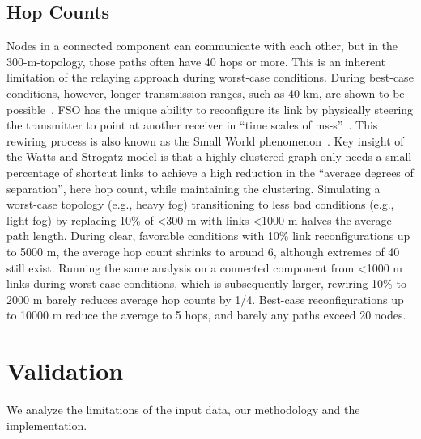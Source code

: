 \documentclass[conference]{IEEEtran}
\begin{document}
    \subsection{Hop Counts}\label{subsec:hop-counts}
    Nodes in a connected component can communicate with each other, but in the 300-m-topology, those paths often have 40 hops or more.
    This is an inherent limitation of the relaying approach during worst-case conditions.
    During best-case conditions, however, longer transmission ranges, such as 40 km, are shown to be possible~\cite{Willitsford:24}.
    FSO has the unique ability to reconfigure its link by physically steering the transmitter to point at another receiver in ``time scales of ms-s''~\cite{invited}.
    This rewiring process is also known as the Small World phenomenon~\cite{smallworld}.
    Key insight of the Watts and Strogatz model is that a highly clustered graph only needs a small percentage of shortcut links to achieve a high reduction in the ``average degrees of separation'', here hop count, while maintaining the clustering.
    Simulating a worst-case topology (e.g., heavy fog) transitioning to less bad conditions (e.g., light fog) by replacing 10\% of \textless300 m with links \textless1000 m halves the average path length.
    During clear, favorable conditions with 10\% link reconfigurations up to 5000 m, the average hop count shrinks to around 6, although extremes of 40 still exist.
    Running the same analysis on a connected component from \textless1000 m links during worst-case conditions, which is subsequently larger, rewiring 10\% to 2000 m barely reduces average hop counts by 1/4.
    Best-case reconfigurations up to 10000 m reduce the average to 5 hops, and barely any paths exceed 20 nodes.



    \section{Validation}\label{sec:validation}
    We analyze the limitations of the input data, our methodology and the implementation.
\end{document}
